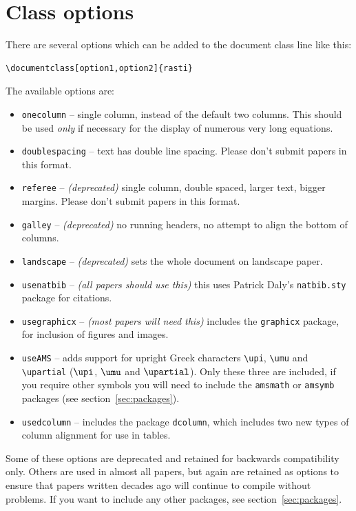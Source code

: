 \documentclass[fleqn,usenatbib,useAMS]{rasti}
\begin{document}
\section{Class options}
\label{sec:options}
There are several options which can be added to the document class line like this:

\begin{verbatim}
\documentclass[option1,option2]{rasti}
\end{verbatim}
The available options are:
\begin{itemize}
\item \verb'onecolumn' -- single column, instead of the default two columns. This should be used {\it only} if necessary for the display of numerous very long equations.
\item \verb'doublespacing' -- text has double line spacing. Please don't submit papers in this format.
\item \verb'referee' -- \textit{(deprecated)} single column, double spaced, larger text, bigger margins. Please don't submit papers in this format.
\item \verb'galley' -- \textit{(deprecated)} no running headers, no attempt to align the bottom of columns.
\item \verb'landscape' -- \textit{(deprecated)} sets the whole document on landscape paper.
\item \verb"usenatbib" -- \textit{(all papers should use this)} this uses Patrick Daly's \verb"natbib.sty" package for citations.
\item \verb"usegraphicx" -- \textit{(most papers will need this)} includes the \verb'graphicx' package, for inclusion of figures and images.
\item \verb'useAMS' -- adds support for upright Greek characters \verb'\upi', \verb'\umu' and \verb'\upartial' ($\upi$, $\umu$ and $\upartial$). Only these three are included, if you require other symbols you will need to include the \verb'amsmath' or \verb'amsymb' packages (see section~\ref{sec:packages}).
\item \verb"usedcolumn" -- includes the package \verb"dcolumn", which includes two new types of column alignment for use in tables.
\end{itemize}

Some of these options are deprecated and retained for backwards compatibility only.
Others are used in almost all papers, but again are retained as options to ensure that papers written decades ago will continue to compile without problems.
If you want to include any other packages, see section~\ref{sec:packages}.
\end{document}
